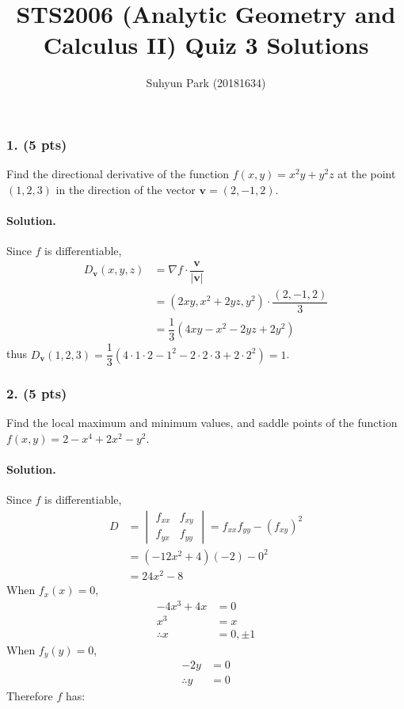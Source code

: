 
	


\title{STS2006 (Analytic Geometry and Calculus II) \newline Quiz 3 Solutions}
\author{Suhyun Park (20181634)}
\maketitle

\subsubsection{1. (5 pts)} Find the directional derivative of the function $f\left(x, y\right)=x^2y+y^2z$ at the point $\left(1, 2, 3\right)$ in the direction of the vector $\mathbf{v}=\left(2, -1, 2\right)$.

\paragraph{Solution.} Since $f$ is differentiable,
\begin{align*}
	D_{\mathbf{v}}\left(x, y, z\right)
	&= \nabla f\cdot\dfrac{\mathbf{v}}{\left|\mathbf{v}\right|}\\
	&= \left(2xy, x^2+2yz, y^2\right)\cdot\dfrac{\left(2, -1, 2\right)}{3}\\
	&= \dfrac{1}{3}\left(4xy-x^2-2yz+2y^2\right)
\end{align*}
thus $D_{\mathbf{v}}\left(1, 2, 3\right)=\dfrac{1}{3}\left(4\cdot1\cdot2-1^2-2\cdot2\cdot3+2\cdot2^2\right)=1$.
\par

\subsubsection{2. (5 pts)} Find the local maximum and minimum values, and saddle points of the function $f\left(x, y\right)=2-x^4+2x^2-y^2$.

\paragraph{Solution.} Since $f$ is differentiable,
\begin{align*}
	D &= \begin{vmatrix}
    		f_{xx} & f_{xy} \\
    		f_{yx} & f_{yy}
  		\end{vmatrix} = f_{xx}f_{yy}-\left(f_{xy}\right)^2\\
  	&= \left(-12x^2+4\right)\left(-2\right)-0^2\\
  	&= 24x^2-8
\end{align*}
When $f_x\left(x\right)=0$,
\begin{align*}
	-4x^3+4x&=0\\
	x^3&=x\\
	\therefore x&=0, \pm1
\end{align*}
When $f_y\left(y\right)=0$,
\begin{align*}
	-2y&=0\\
	\therefore y&=0
\end{align*}
Therefore $f$ has:

